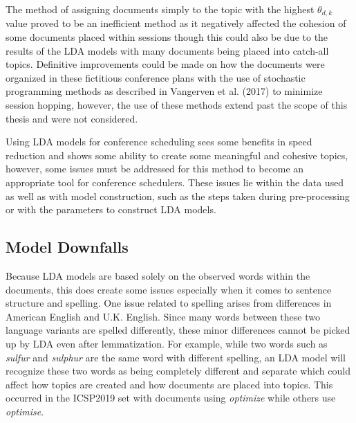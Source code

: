 \documentclass[a4paper, 12pt, twoside]{article}
\numberwithin{equation}{section} %
\begin{document}
The method of assigning documents simply to the topic with the highest $\theta_{d,k}$ value proved to be an inefficient method as it negatively affected the cohesion of some documents placed within sessions though this could also be due to the results of the LDA models with many documents being placed into catch-all topics. Definitive improvements could be made on how the documents were organized in these fictitious conference plans with the use of stochastic programming methods as described in Vangerven et al. (2017) to minimize session hopping, however, the use of these methods extend past the scope of this thesis and were not considered.

Using LDA models for conference scheduling sees some benefits in speed reduction and shows some ability to create some meaningful and cohesive topics, however, some issues must be addressed for this method to become an appropriate tool for conference schedulers. These issues lie within the data used as well as with model construction, such as the steps taken during pre-processing or with the parameters to construct LDA models.

\subsection{Model Downfalls}

Because LDA models are based solely on the observed words within the documents, this does create some issues especially when it comes to sentence structure and spelling. One issue related to spelling arises from differences in American English and U.K. English. Since many words between these two language variants are spelled differently, these minor differences cannot be picked up by LDA even after lemmatization. For example, while two words such as \textit{sulfur} and \textit{sulphur} are the same word with different spelling, an LDA model will recognize these two words as being completely different and separate which could affect how topics are created and how documents are placed into topics. This occurred in the ICSP2019 set with documents using \textit{optimize} while others use \textit{optimise}.
\end{document}
